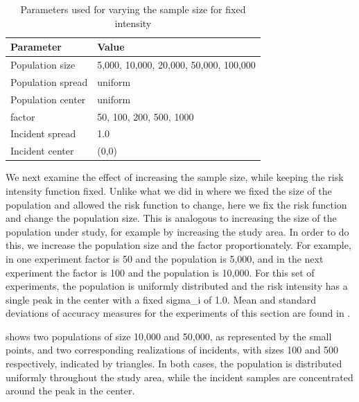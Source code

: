 \begin{table}[htbp]
    \centering
    \begin{tabular}{ll}
        \toprule
        Parameter & Value \\
        \midrule
        Population size & 5,000, 10,000, 20,000, 50,000, 100,000 \\
        Population \gls{spread} & uniform \\
        Population center & uniform \\
        \Gls{factor} & 50, 100, 200, 500, 1000 \\
        Incident \gls{spread} & 1.0 \\
        Incident center & (0,0) \\
        \bottomrule
    \end{tabular}
    \caption{Parameters used for varying the sample size for fixed intensity}
    \label{tab:params:unifNpop_1h}
\end{table}

We next examine the effect of increasing the sample size, while keeping the risk intensity function fixed.
Unlike what we did in  where we fixed the size of the population and allowed the risk function to change,
here we fix the risk function and change the population size.
This is analogous to increasing the size of the population under study, for example by increasing the study area.
In order to do this, we increase the population size and the \gls{factor} proportionately.
For example, in one experiment \gls{factor} is 50 and the population is 5,000,
and in the next experiment the \gls{factor} is 100 and the population is 10,000.
For this set of experiments, the population is uniformly distributed and the risk intensity has a single peak in the center with a fixed \gls{sigma_i} of 1.0.
Mean and standard deviations of accuracy measures for the experiments of this section are found in .

 shows two populations of size 10,000 and 50,000,
as represented by the small points,
and two corresponding realizations of \glspl{incident},
with sizes 100 and 500 respectively,
indicated by triangles.
In both cases,
the population is distributed uniformly throughout the study area,
while the incident samples are concentrated around the peak in the center.

